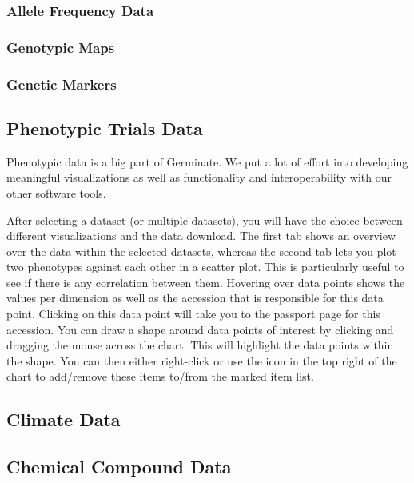 \subsubsection{Allele Frequency Data}

\subsubsection{Genotypic Maps}
\label{sec:features:genotypic-maps}

\subsubsection{Genetic Markers}

\subsection{Phenotypic Trials Data}
Phenotypic data is a big part of Germinate. We put a lot of effort into developing meaningful visualizations as well as functionality and interoperability with our other software tools. 

After selecting a dataset (or multiple datasets), you will have the choice between different visualizations and the data download. The first tab shows an overview over the data within the selected datasets, whereas the second tab lets you plot two phenotypes against each other in a scatter plot. This is particularly useful to see if there is any correlation between them. Hovering over data points shows the values per dimension as well as the accession that is responsible for this data point. Clicking on this data point will take you to the passport page for this accession. You can draw a shape around data points of interest by clicking and dragging the mouse across the chart. This will highlight the data points within the shape. You can then either right-click or use the icon in the top right of the chart to add/remove these items to/from the marked item list.

\subsection{Climate Data}

\subsection{Chemical Compound Data}